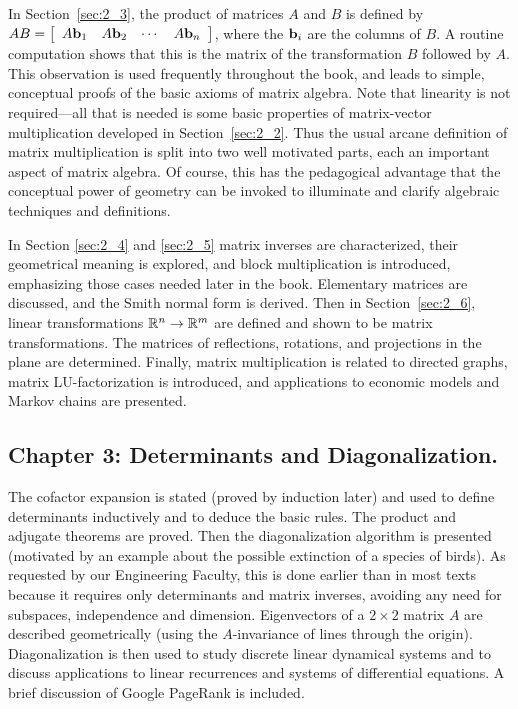 In Section~\ref{sec:2_3}, the product of matrices $A$ and $B$ is defined by $AB = \left[ \begin{array}{cccc} A\textbf{b}_1 & A\textbf{b}_2 & \cdots & A\textbf{b}_n \end{array}\right]$, where the $\textbf{b}_i$ are the columns of $B$. A routine computation shows that this is the matrix of the transformation $B$ followed by $A$.
 This observation is used frequently throughout the book, and leads to 
simple, conceptual proofs of the basic axioms of matrix algebra. Note 
that linearity is not required---all that is needed is some basic 
properties of matrix-vector multiplication developed in Section~\ref{sec:2_2}.
 Thus the usual arcane definition of matrix multiplication is split into
 two well motivated parts, each an important aspect of matrix algebra. 
Of course, this has the pedagogical advantage that the conceptual power 
of geometry can be invoked to illuminate and clarify algebraic 
techniques and definitions.


In Section \ref{sec:2_4} and \ref{sec:2_5}
 matrix inverses are characterized, their geometrical meaning is 
explored, and block multiplication is introduced, emphasizing those 
cases needed later in the book. Elementary matrices are discussed, and 
the Smith normal form is derived. Then in Section~\ref{sec:2_6}, linear transformations $\mathbb{R}^n \to \mathbb{R}^m$ are defined and shown to be matrix transformations. The matrices of reflections, rotations, and projections in the plane are determined. Finally, matrix multiplication is related to directed graphs, matrix 
LU-factorization is introduced, and applications to economic models and 
Markov chains are presented.



\subsection*{Chapter 3: Determinants and Diagonalization.}


The cofactor expansion is stated 
(proved by induction later) and used to define determinants inductively 
and to deduce the basic rules. The product and adjugate theorems are 
proved. Then the diagonalization algorithm is presented (motivated by an
 example about the possible extinction of a species of birds). As 
requested by our Engineering Faculty, this is done earlier than in most 
texts because it requires only determinants and matrix inverses, 
avoiding any need for subspaces, independence and dimension. 
Eigenvectors of a $2 \times 2$ matrix $A$ are described geometrically (using the $A$-invariance
 of lines through the origin). Diagonalization is then used to study 
discrete linear dynamical systems and to discuss applications to linear 
recurrences and systems of differential equations. A brief discussion of
 Google PageRank is included.



